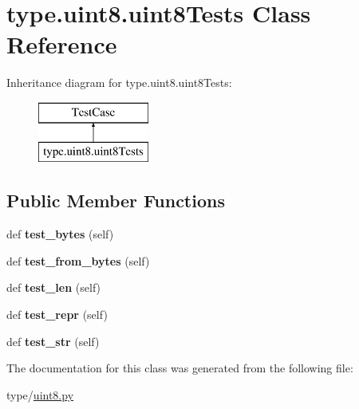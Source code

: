 \hypertarget{classtype_1_1uint8_1_1uint8Tests}{}\section{type.\+uint8.\+uint8\+Tests Class Reference}
\label{classtype_1_1uint8_1_1uint8Tests}
Inheritance diagram for type.\+uint8.\+uint8\+Tests\+:\begin{figure}[H]
\begin{center}
\leavevmode
\includegraphics[height=2.000000cm]{classtype_1_1uint8_1_1uint8Tests}
\end{center}
\end{figure}
\subsection*{Public Member Functions}
\begin{DoxyCompactItemize}
\item 
\mbox{\label{classtype_1_1uint8_1_1uint8Tests_a7ed5a01e85e2c46bb341c50405faae98}} 
def {\bfseries test\+\_\+bytes} (self)
\item 
\mbox{\label{classtype_1_1uint8_1_1uint8Tests_a88dc217f501ca92cf57f27e6d906ba3a}} 
def {\bfseries test\+\_\+from\+\_\+bytes} (self)
\item 
\mbox{\label{classtype_1_1uint8_1_1uint8Tests_a606af580b180fe526e1a2e7caffd2721}} 
def {\bfseries test\+\_\+len} (self)
\item 
\mbox{\label{classtype_1_1uint8_1_1uint8Tests_a0c9149540dca321c8cd4321c920c32f4}} 
def {\bfseries test\+\_\+repr} (self)
\item 
\mbox{\label{classtype_1_1uint8_1_1uint8Tests_a832f38b0d12c10d4f90a8327c9521756}} 
def {\bfseries test\+\_\+str} (self)
\end{DoxyCompactItemize}


The documentation for this class was generated from the following file\+:\begin{DoxyCompactItemize}
\item 
type/\mbox{\hyperlink{uint8_8py}{uint8.\+py}}\end{DoxyCompactItemize}
